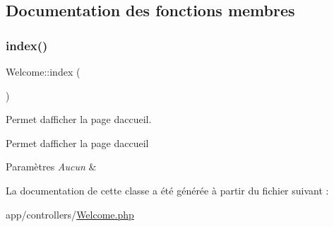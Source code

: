 \subsection{Documentation des fonctions membres}
\mbox{\label{class_welcome_a8aadbfbd06b65a6538badbed8569b293}} 
\subsubsection{\texorpdfstring{index()}{index()}}
{\footnotesize\ttfamily Welcome\+::index (\begin{DoxyParamCaption}{ }\end{DoxyParamCaption})}



Permet d\textquotesingle{}afficher la page d\textquotesingle{}accueil. 

Permet d\textquotesingle{}afficher la page d\textquotesingle{}accueil 
\begin{DoxyParams}{Paramètres}
{\em Aucun} & \\
\hline
\end{DoxyParams}


La documentation de cette classe a été générée à partir du fichier suivant \+:\begin{DoxyCompactItemize}
\item 
app/controllers/\hyperlink{_welcome_8php}{Welcome.\+php}\end{DoxyCompactItemize}
